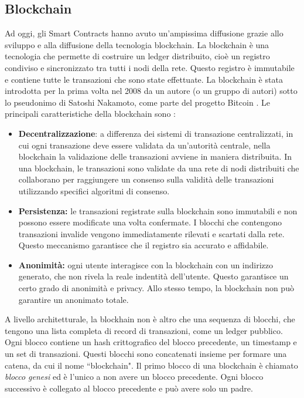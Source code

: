 \documentclass[../../Thesis.tex]{subfiles}
\begin{document}
\subsection{Blockchain}
Ad oggi, gli Smart Contracts hanno avuto un'ampissima diffusione grazie allo sviluppo  e alla diffusione della tecnologia blockchain. La blockchain \`e una tecnologia che permette di costruire un ledger distribuito, cio\`e un registro condiviso e sincronizzato tra tutti i nodi della rete. Questo registro \`e immutabile e contiene tutte le transazioni che sono state effettuate. La blockchain \`e stata introdotta per la prima volta nel 2008 da un autore (o un gruppo di autori) sotto lo pseudonimo di Satoshi Nakamoto, come parte del progetto Bitcoin \cite{Bitcoin}. Le principali caratteristiche della blockchain sono \cite{Blockchain}:
\begin{itemize}
    \item \textbf{Decentralizzazione}: 
    a differenza dei sistemi di transazione centralizzati, in cui ogni transazione deve essere validata da un'autorit\`a centrale, nella blockchain la validazione delle transazioni avviene in maniera distribuita. In una blockchain, le transazioni sono validate da una rete di nodi distribuiti che collaborano per raggiungere un consenso sulla validit\`a delle transazioni utilizzando specifici algoritmi di consenso.
    \item \textbf{Persistenza:} 
    le transazioni registrate sulla blockchain sono immutabili e non possono essere modificate una volta confermate. I blocchi che contengono transazioni invalide vengono immediatamente rilevati e scartati dalla rete. Questo meccanismo garantisce che il registro sia accurato e affidabile.
    \item \textbf{Anonimit\`a:} ogni utente interagisce con la blockchain con un indirizzo generato, che non rivela la reale indentit\`a dell'utente. Questo garantisce un certo grado di anonimit\`a e privacy. Allo stesso tempo, la blockchain non pu\`o garantire un anonimato totale. 
\end{itemize}
A livello architetturale, la blockhain non \`e altro che una sequenza di blocchi, che tengono una lista completa di record di transazioni, come un ledger pubblico. Ogni blocco contiene un hash crittografico del blocco precedente, un timestamp e un set di transazioni. Questi blocchi sono concatenati insieme per formare una catena, da cui il nome ``blockchain". Il primo blocco di una blockchain \`e chiamato \emph{blocco genesi} ed \`e l'unico a non avere un blocco precedente. Ogni blocco successivo \`e collegato al blocco precedente e pu\`o avere solo un padre.\\
\end{document}
